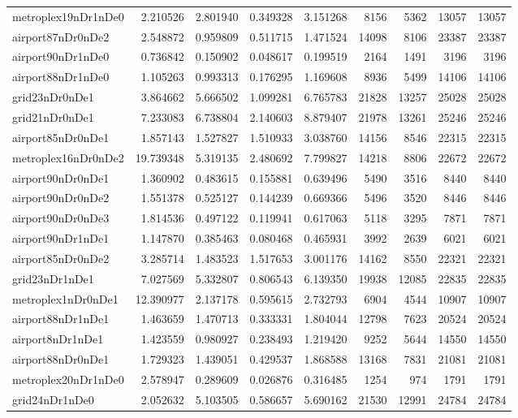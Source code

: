 \begin{longtable}{|l|r|r|r|r|r|r|r|r|}
metroplex19nDr1nDe0 & 2.210526 & 2.801940 & 0.349328 & 3.151268 & 8156 & 5362 & 13057 & 13057 \\
airport87nDr0nDe2 & 2.548872 & 0.959809 & 0.511715 & 1.471524 & 14098 & 8106 & 23387 & 23387 \\
airport90nDr1nDe0 & 0.736842 & 0.150902 & 0.048617 & 0.199519 & 2164 & 1491 & 3196 & 3196 \\
airport88nDr1nDe0 & 1.105263 & 0.993313 & 0.176295 & 1.169608 & 8936 & 5499 & 14106 & 14106 \\
grid23nDr0nDe1 & 3.864662 & 5.666502 & 1.099281 & 6.765783 & 21828 & 13257 & 25028 & 25028 \\
grid21nDr0nDe1 & 7.233083 & 6.738804 & 2.140603 & 8.879407 & 21978 & 13261 & 25246 & 25246 \\
airport85nDr0nDe1 & 1.857143 & 1.527827 & 1.510933 & 3.038760 & 14156 & 8546 & 22315 & 22315 \\
metroplex16nDr0nDe2 & 19.739348 & 5.319135 & 2.480692 & 7.799827 & 14218 & 8806 & 22672 & 22672 \\
airport90nDr0nDe1 & 1.360902 & 0.483615 & 0.155881 & 0.639496 & 5490 & 3516 & 8440 & 8440 \\
airport90nDr0nDe2 & 1.551378 & 0.525127 & 0.144239 & 0.669366 & 5496 & 3520 & 8446 & 8446 \\
airport90nDr0nDe3 & 1.814536 & 0.497122 & 0.119941 & 0.617063 & 5118 & 3295 & 7871 & 7871 \\
airport90nDr1nDe1 & 1.147870 & 0.385463 & 0.080468 & 0.465931 & 3992 & 2639 & 6021 & 6021 \\
airport85nDr0nDe2 & 3.285714 & 1.483523 & 1.517653 & 3.001176 & 14162 & 8550 & 22321 & 22321 \\
grid23nDr1nDe1 & 7.027569 & 5.332807 & 0.806543 & 6.139350 & 19938 & 12085 & 22835 & 22835 \\
metroplex1nDr0nDe1 & 12.390977 & 2.137178 & 0.595615 & 2.732793 & 6904 & 4544 & 10907 & 10907 \\
airport88nDr1nDe1 & 1.463659 & 1.470713 & 0.333331 & 1.804044 & 12798 & 7623 & 20524 & 20524 \\
airport8nDr1nDe1 & 1.423559 & 0.980927 & 0.238493 & 1.219420 & 9252 & 5644 & 14550 & 14550 \\
airport88nDr0nDe1 & 1.729323 & 1.439051 & 0.429537 & 1.868588 & 13168 & 7831 & 21081 & 21081 \\
metroplex20nDr1nDe0 & 2.578947 & 0.289609 & 0.026876 & 0.316485 & 1254 & 974 & 1791 & 1791 \\
grid24nDr1nDe0 & 2.052632 & 5.103505 & 0.586657 & 5.690162 & 21530 & 12991 & 24784 & 24784 \\

\end{longtable}

